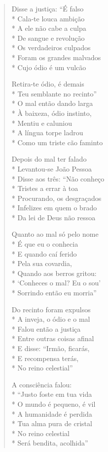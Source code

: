 \begin{verse}
Disse a justiça: ``É falso\\*
Cala-te louca ambição\\*
A ele não cabe a culpa\\*
De sangue e revolução\\*
Os verdadeiros culpados\\*
Foram os grandes malvados\\*
Cujo ódio é um vulcão

Retira-te ódio, é demais\\*
Teu semblante no recinto''\\*
O mal então dando larga\\*
À baixeza, ódio instinto,\\*
Mentiu e caluniou\\*
A língua torpe ladrou\\*
Como um triste cão faminto

Depois do mal ter falado\\*
Levantou-se João Pessoa\\*
Disse aos três: ``Não conheço\\*
Tristes a errar à toa\\*
Procurando, os desgraçados\\*
Infelizes em quem o brado\\*
Da lei de Deus não ressoa

Quanto ao mal só pelo nome\\*
É que eu o conhecia\\*
E quando caí ferido\\*
Pela sua covardia,\\*
Quando aos berros gritou:\\*
`Conheces o mal? Eu o sou'\\*
Sorrindo então eu morria''

Do recinto foram expulsos\\*
A inveja, o ódio e o mal\\*
Falou então a justiça\\*
Entre outras coisas afinal\\*
E disse: ``Irmão, ficarás,\\*
E recompensa terás,\\*
No reino celestial''

A consciência falou:\\*
``Justo foste em tua vida\\*
O mundo é pequeno, é vil\\*
A humanidade é perdida\\*
Tua alma pura de cristal\\*
No reino celestial\\*
Será bendita, acolhida''


\end{verse}
